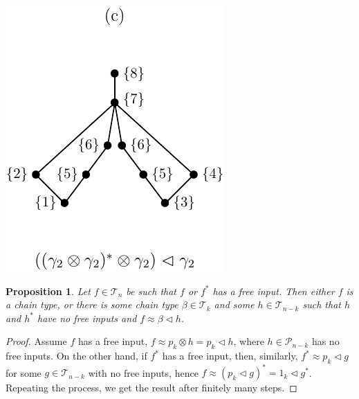 \documentclass[12pt]{article}
\newtheorem{prop}{Proposition}
\theoremstyle{definition}
\theoremstyle{remark}
\def\Te{\mathcal T}
\def\Pe{\mathcal P}
\def\vtl{\vartriangleleft}
\begin{document}
\begin{center}
\begin{minipage}[c]{0.3\textwidth}
\includegraphics[scale=0.9]{fri_ccc.pdf}
\end{minipage}
\end{center}



\begin{prop}\label{prop:pf0_smallest} Let $f\in \Te_n$ be such that $f$ or
$f^*$ has a free input. 
Then either $f$ is a chain type, or there is some chain type $\beta\in
\Te_k$ and some $h\in \Te_{n-k}$ such that $h$ and $h^*$ have no free inputs and
$f\approx \beta\vtl
h$. 

\end{prop}


\begin{proof} Assume $f$ has a free input, $f\approx p_k\otimes
h=p_k\vtl h$,
where  $h\in \Pe_{n-k}$ has no free inputs. On the other hand, if $f^*$ has a
free input, then, similarly, $f^*\approx p_k\vtl g$ for some $g\in \Te_{n-k}$ with no free
inputs, hence $f\approx (p_k\vtl g)^*=1_k\vtl g^*$. Repeating the process, we get the result
after finitely many steps.


\end{proof}
\end{document}
